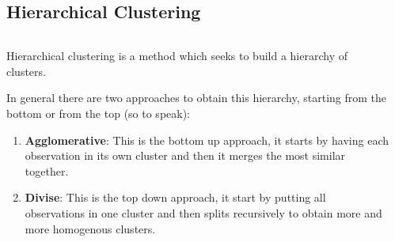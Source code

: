 \documentclass[aspectratio=169,10pt]{beamer}
\begin{document}
\subsection{Hierarchical Clustering}
\begin{frame}{\secname}{\subsecname}
  \begin{columns}
    \begin{column}{.7\textwidth}  
      Hierarchical clustering is a method which seeks to build a hierarchy of clusters.
      
      In general there are two approaches to obtain this hierarchy, starting from the bottom or from the top (so to speak):
      \begin{enumerate}
        \item \textbf{Agglomerative}: This is the bottom up approach, it starts by having each observation in its own cluster and then it merges the most similar together.
        \item \textbf{Divise}: This is the top down approach, it start by putting all observations in one cluster and then splits recursively to obtain more and more homogenous clusters.
      \end{enumerate}
    \end{column}
    \begin{column}{.3\textwidth}
    \end{column}
  \end{columns}
\end{frame}
\end{document}
